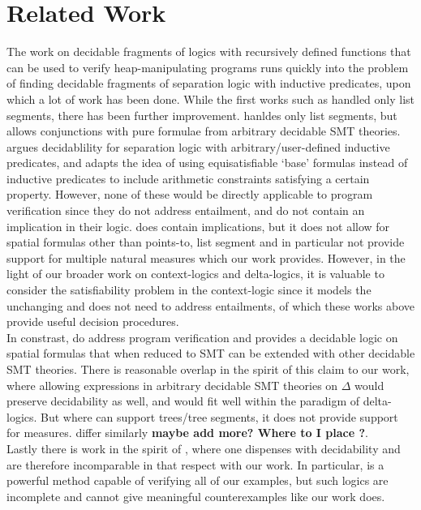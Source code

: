 \section{Related Work}
The work on decidable fragments of logics with recursively defined functions that can be used to verify heap-manipulating programs runs quickly into the problem of finding decidable fragments of separation logic \cite{Reynolds2002} with inductive predicates, upon which a lot of work has been done. While the first works such as  \cite{BerdineCalcagnoO'Hearn2004, BerdineCalcagnoO'Hearn2005, CookHaaseChristoph2011,PerezAntonioRybalchenko2011 } handled only list segments, there has been further improvement. \cite{PerezRybalchenko2013} hanldes only list segments, but allows conjunctions with pure formulae from arbitrary decidable SMT theories. \cite{BrotherstonFuhsPerez2014} argues decidablility for separation logic with arbitrary/user-defined inductive predicates, and \cite{LeTatsutaSun2017,LeSunChin2016 } adapts the idea of using equisatisfiable `base' formulas instead of inductive predicates to include arithmetic constraints satisfying a certain property. However, none of these would be directly applicable to program verification since they do not address entailment, and do not contain an implication in their logic.  \cite{PerezRybalchenko2013} does contain implications, but it does not allow for spatial formulas other than points-to, list segment and in particular not provide support for multiple natural measures which our work provides. However, in the light of our broader work on context-logics and delta-logics, it is valuable to consider the satisfiability problem in the context-logic since it models the unchanging and does not need to address entailments, of which these works above provide useful decision procedures.\\
In constrast, \cite{PiskacWiesZufferey2014, PiskacWiesZufferey2014Tool} do address program verification and provides a decidable logic on spatial formulas that when reduced to SMT can be extended with other decidable SMT theories. There is reasonable overlap in the spirit of this claim to our work, where allowing expressions in arbitrary decidable SMT theories on $\Delta{}$  would preserve decidability as well, and would fit well within the paradigm of delta-logics. But where \cite{PiskacWiesZufferey2014} can support trees/tree segments, it does not provide support for measures. \cite{MadhusudanParlatoQiu2011, IosifRogalewiczSimacek2013} differ similarly \textbf{maybe add more? Where to I place \cite{BouajjaniDruagoiEnea2009} ?}.\\
Lastly there is work in the spirit of \cite{ChinDavidNguyen2007, QiuGargStefanescu2013}, where one dispenses with decidability and are therefore incomparable in that respect with our work. In particular, \cite{QiuGargStefanescu2013} is a powerful method capable of verifying all of our examples, but such logics are incomplete and cannot give meaningful counterexamples like our work does.